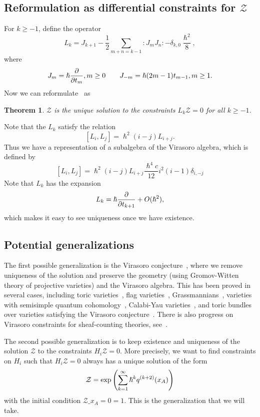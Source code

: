 \documentclass[leqno, openany]{memoir}
\theoremstyle{definition}
\theoremstyle{remark}
\theoremstyle{plain}
\newtheorem*{thm*}{Theorem}
\theoremstyle{definition}
\theoremstyle{remark}
\newcommand{\mc}[1]{\mathcal{#1}}
\begin{document}
\subsection{Reformulation as differential constraints for $\mc{Z}$}

For $k \geq -1$, define the operator
\[ L_k = J_{k+1} - \frac{1}{2} \sum_{m+n=k-1} :J_m J_n: - \delta_{k,0} \frac{\hslash^2}{8}, \]
where
\[ J_m = \hslash \pdv{t_m}, m \geq 0 \qquad J_{-m} = \hslash(2m-1)t_{m-1}, m \geq 1. \]
Now we can reformulate~ as
\begin{thm*}
    $\mc{Z}$ is the unique solution to the constraints $L_k \mc{Z} = 0$ for all $k \geq -1$.
\end{thm*}

Note that the $L_k$ satisfy the relation
\[ [L_i, L_j] = \hslash^2(i-j)L_{i+j}. \]
Thus we have a representation of a subalgebra of the Virasoro algebra, which is defined by
\[ [L_i, L_j] = \hslash^2(i-j)L_{i+j} \frac{\hslash^4 c}{12} i^2(i-1) \delta_{i, -j} \]
Note that $L_k$ has the expansion
\[ L_k = \hslash \pdv{t_{k+1}} + O(\hslash^2), \]
which makes it easy to see uniqueness once we have existence.

\subsection{Potential generalizations}

The first possible generalization is the Virasoro conjecture~\cite{virasoroconj}, where we remove uniqueness of the solution and preserve the geometry (using Gromov-Witten theory of projective varieties) and the Virasoro algebra. This has been proved in several cases, including toric varieties~\cites{virasorofanotoric}{virasorotoric}, flag varieties~\cite{virasoroflag}, Grassmannians~\cite{virasorograss}, varieties with semisimple quantum cohomology~\cite{2dsscohft}, Calabi-Yau varieties~\cite{virasorogw}, and toric bundles over varieties satisfying the Virasoro conjecture~\cite{virasorotoricbundle}. There is also progress on Virasoro constraints for sheaf-counting theories, see~\cite{virasoropt}.

The second possible generalization is to keep existence and uniqueness of the solution $\mc{Z}$ to the constraints $H_i \mc{Z} = 0$. More precisely, we want to find constraints on $H_i$ such that $H_i \mc{Z} = 0$ always has a unique solution of the form
\[ \mc{Z} = \exp \qty(\sum_{k=1}^{\infty} \hslash^k q^{(k+2)}(x_A)) \]
with the initial condition $\mc{Z} \_{x_A = 0} = 1$. This is the generalization that we will take.
\end{document}

